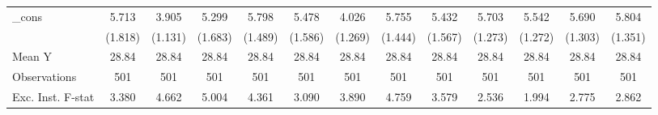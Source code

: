 {\begin{tabular}{l*{12}{c}}
\addlinespace
\_cons      &       5.713\sym{***}&       3.905\sym{***}&       5.299\sym{***}&       5.798\sym{***}&       5.478\sym{***}&       4.026\sym{***}&       5.755\sym{***}&       5.432\sym{***}&       5.703\sym{***}&       5.542\sym{***}&       5.690\sym{***}&       5.804\sym{***}\\
            &     (1.818)         &     (1.131)         &     (1.683)         &     (1.489)         &     (1.586)         &     (1.269)         &     (1.444)         &     (1.567)         &     (1.273)         &     (1.272)         &     (1.303)         &     (1.351)         \\
\midrule
Mean Y      &       28.84         &       28.84         &       28.84         &       28.84         &       28.84         &       28.84         &       28.84         &       28.84         &       28.84         &       28.84         &       28.84         &       28.84         \\
Observations&         501         &         501         &         501         &         501         &         501         &         501         &         501         &         501         &         501         &         501         &         501         &         501         \\
Exc. Inst. F-stat&       3.380         &       4.662         &       5.004         &       4.361         &       3.090         &       3.890         &       4.759         &       3.579         &       2.536         &       1.994         &       2.775         &       2.862         \\
\bottomrule
\end{tabular}
}
